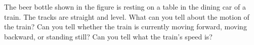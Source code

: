The beer bottle shown in the figure is resting on a table in the dining car of a train.
The tracks are straight and level. What can you tell about the motion of the
train? Can you tell whether the train is currently moving forward, moving backward,
or standing still? Can you tell what the train's speed is?
